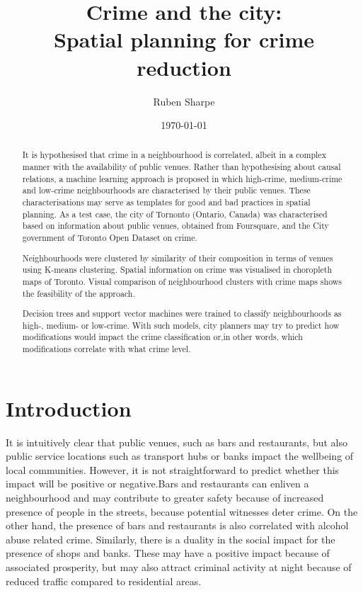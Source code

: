 \documentclass{article}
\author{Ruben Sharpe}
\title{Crime and the city:\\Spatial planning for crime reduction}
\date{\today}
\begin{document}
\maketitle

\begin{abstract}
 It is hypothesised that crime in a neighbourhood is correlated, albeit in a complex manner with the availability of public venues. Rather than hypothesising about causal relations, a machine learning approach is proposed in which high-crime, medium-crime and low-crime neighbourhoods are characterised by their public venues. These characterisations may serve as templates for good and bad practices in spatial planning.
 As a test case, the city of Tornonto (Ontario, Canada) was characterised based on information about public venues, obtained from Foursquare, and the City government of Toronto Open Dataset on crime. 
 
 Neighbourhoods were clustered by similarity of their composition in terms of venues using K-means clustering.  
 Spatial information on crime was visualised in choropleth maps of Toronto. Visual comparison of neighbourhood clusters with crime maps shows the feasibility of the approach.
 
 Decision trees and support vector machines were trained to classify neighbourhoods as high-, medium- or low-crime. With such models, city planners may try to predict how modifications would impact the crime classification or,in other words, which modifications correlate with what crime level.
\end{abstract}

\tableofcontents



\section{Introduction}
It is intuitively clear that public venues, such as bars and restaurants, but also public service locations such as transport hubs or banks impact the wellbeing of local communities. However, it is not straightforward to predict whether this impact will be positive or negative.Bars and restaurants can enliven a neighbourhood and may contribute to greater safety because of increased presence of people in the streets, because potential witnesses deter crime. On the other hand, the presence of bars and restaurants is also correlated with alcohol abuse related crime. Similarly, there is a duality in the social impact for the presence of shops and banks. These may have a positive impact because of associated prosperity, but may also attract criminal activity at night because of reduced traffic compared to residential areas.\\
\end{document}
